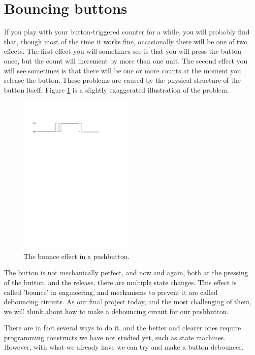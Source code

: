 \documentclass[../physical_computing.tex]{subfiles}
\begin{document}
\section{Bouncing buttons}
\label{sec:bounce}

If you play with your button-triggered counter for a while, you will probably find that, though most of the time it works fine, occasionally there will be one of two effects. The first effect you will sometimes see is that you will press the button once, but the count will increment by more than one unit. The second effect you will see sometimes is that there will be one or more counts at the moment you release the button. These problems are caused by the physical structure of the button itself. Figure \ref{fig:button} is a slightly exaggerated illustration of the problem.

\begin{figure}[htbp]
    \centering
    \includegraphics[width=0.5\textwidth]{chapter_2/figures/button.pdf}
    \caption{The bounce effect in a pushbutton.}
    \label{fig:button}
\end{figure}

The button is not mechanically perfect, and now and again, both at the pressing of the button, and the release, there are multiple state changes. This effect is called 'bounce' in engineering, and mechanisms to prevent it are called debouncing circuits. As our final project today, and the most challenging of them, we will think about how to make a debouncing circuit for our pushbutton.

There are in fact several ways to do it, and the better and clearer ones require programming constructs we have not studied yet, such as state machines. However, with what we already have we can try and make a button debouncer.
\end{document}
